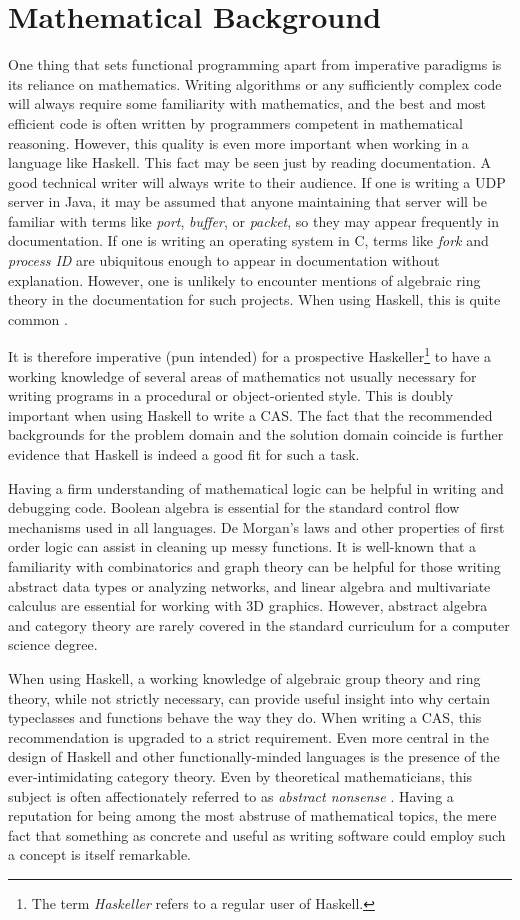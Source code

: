 \documentclass[MS, xcolor=dvipsnames]{wfuthesis}
\theoremstyle{definition}
\begin{document}
\chapter{Mathematical Background}
One thing that sets functional programming apart from imperative paradigms is its reliance on mathematics. Writing algorithms or any sufficiently complex code will always require some familiarity with mathematics, and the best and most efficient code is often written by programmers competent in mathematical reasoning. However, this quality is even more important when working in a language like Haskell. This fact may be seen just by reading documentation. A good technical writer will always write to their audience. If one is writing a UDP server in Java, it may be assumed that anyone maintaining that server will be familiar with terms like \textit{port}, \textit{buffer}, or \textit{packet}, so they may appear frequently in documentation. If one is writing an operating system in C, terms like \textit{fork} and \textit{process ID} are ubiquitous enough to appear in documentation without explanation. However, one is unlikely to encounter mentions of algebraic ring theory in the documentation for such projects. When using Haskell, this is quite common \cite{Prelude}. \par
It is therefore imperative (pun intended) for a prospective Haskeller\footnote{The term \textit{Haskeller} refers to a regular user of Haskell.} to have a working knowledge of several areas of mathematics not usually necessary for writing programs in a procedural or object-oriented style. This is doubly important when using Haskell to write a CAS. The fact that the recommended backgrounds for the problem domain and the solution domain coincide is further evidence that Haskell is indeed a good fit for such a task. \par
Having a firm understanding of mathematical logic can be helpful in writing and debugging code. Boolean algebra is essential for the standard control flow mechanisms used in all languages. De Morgan's laws and other properties of first order logic can assist in cleaning up messy functions. It is well-known that a familiarity with combinatorics and graph theory can be helpful for those writing abstract data types or analyzing networks, and linear algebra and multivariate calculus are essential for working with 3D graphics. However, abstract algebra and category theory are rarely covered in the standard curriculum for a computer science degree. \par
When using Haskell, a working knowledge of algebraic group theory and ring theory, while not strictly necessary, can provide useful insight into why certain typeclasses and functions behave the way they do. When writing a CAS, this recommendation is upgraded to a strict requirement. Even more central in the design of Haskell and other functionally-minded languages is the presence of the ever-intimidating category theory. Even by theoretical mathematicians, this subject is often affectionately referred to as \textit{abstract nonsense} \cite{Saunders1997}. Having a reputation for being among the most abstruse of mathematical topics, the mere fact that something as concrete and useful as writing software could employ such a concept is itself remarkable. \par
\end{document}
